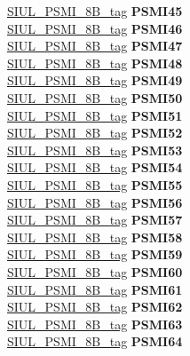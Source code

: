 \begin{DoxyCompactItemize}
\begin{tabbing}
\>\>\mbox{\hyperlink{unionSIUL__PSMI__8B__tag}{SIUL\_PSMI\_8B\_tag}} {\bfseries PSMI45}\\
\>\>\mbox{\hyperlink{unionSIUL__PSMI__8B__tag}{SIUL\_PSMI\_8B\_tag}} {\bfseries PSMI46}\\
\>\>\mbox{\hyperlink{unionSIUL__PSMI__8B__tag}{SIUL\_PSMI\_8B\_tag}} {\bfseries PSMI47}\\
\>\>\mbox{\hyperlink{unionSIUL__PSMI__8B__tag}{SIUL\_PSMI\_8B\_tag}} {\bfseries PSMI48}\\
\>\>\mbox{\hyperlink{unionSIUL__PSMI__8B__tag}{SIUL\_PSMI\_8B\_tag}} {\bfseries PSMI49}\\
\>\>\mbox{\hyperlink{unionSIUL__PSMI__8B__tag}{SIUL\_PSMI\_8B\_tag}} {\bfseries PSMI50}\\
\>\>\mbox{\hyperlink{unionSIUL__PSMI__8B__tag}{SIUL\_PSMI\_8B\_tag}} {\bfseries PSMI51}\\
\>\>\mbox{\hyperlink{unionSIUL__PSMI__8B__tag}{SIUL\_PSMI\_8B\_tag}} {\bfseries PSMI52}\\
\>\>\mbox{\hyperlink{unionSIUL__PSMI__8B__tag}{SIUL\_PSMI\_8B\_tag}} {\bfseries PSMI53}\\
\>\>\mbox{\hyperlink{unionSIUL__PSMI__8B__tag}{SIUL\_PSMI\_8B\_tag}} {\bfseries PSMI54}\\
\>\>\mbox{\hyperlink{unionSIUL__PSMI__8B__tag}{SIUL\_PSMI\_8B\_tag}} {\bfseries PSMI55}\\
\>\>\mbox{\hyperlink{unionSIUL__PSMI__8B__tag}{SIUL\_PSMI\_8B\_tag}} {\bfseries PSMI56}\\
\>\>\mbox{\hyperlink{unionSIUL__PSMI__8B__tag}{SIUL\_PSMI\_8B\_tag}} {\bfseries PSMI57}\\
\>\>\mbox{\hyperlink{unionSIUL__PSMI__8B__tag}{SIUL\_PSMI\_8B\_tag}} {\bfseries PSMI58}\\
\>\>\mbox{\hyperlink{unionSIUL__PSMI__8B__tag}{SIUL\_PSMI\_8B\_tag}} {\bfseries PSMI59}\\
\>\>\mbox{\hyperlink{unionSIUL__PSMI__8B__tag}{SIUL\_PSMI\_8B\_tag}} {\bfseries PSMI60}\\
\>\>\mbox{\hyperlink{unionSIUL__PSMI__8B__tag}{SIUL\_PSMI\_8B\_tag}} {\bfseries PSMI61}\\
\>\>\mbox{\hyperlink{unionSIUL__PSMI__8B__tag}{SIUL\_PSMI\_8B\_tag}} {\bfseries PSMI62}\\
\>\>\mbox{\hyperlink{unionSIUL__PSMI__8B__tag}{SIUL\_PSMI\_8B\_tag}} {\bfseries PSMI63}\\
\>\>\mbox{\hyperlink{unionSIUL__PSMI__8B__tag}{SIUL\_PSMI\_8B\_tag}} {\bfseries PSMI64}\\

\end{tabbing}
\end{DoxyCompactItemize}

